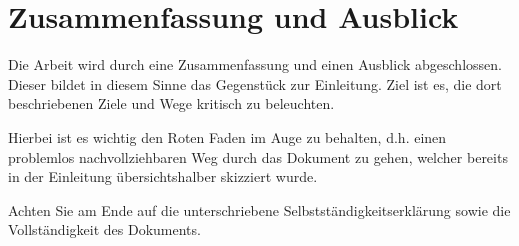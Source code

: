 \chapter{Zusammenfassung und Ausblick}
\label{sec:ZusammenfassungUndAusblick}

Die Arbeit wird durch eine Zusammenfassung und einen Ausblick abgeschlossen. Dieser bildet in diesem Sinne das Gegenstück zur Einleitung. Ziel ist es, die dort beschriebenen Ziele und Wege kritisch zu beleuchten. \par
Hierbei ist es wichtig den Roten Faden im Auge zu behalten, d.h. einen problemlos nachvollziehbaren Weg durch das Dokument zu gehen, welcher bereits in der Einleitung übersichtshalber skizziert wurde.\par
Achten Sie am Ende auf die unterschriebene Selbstständigkeitserklärung sowie die Vollständigkeit des Dokuments.